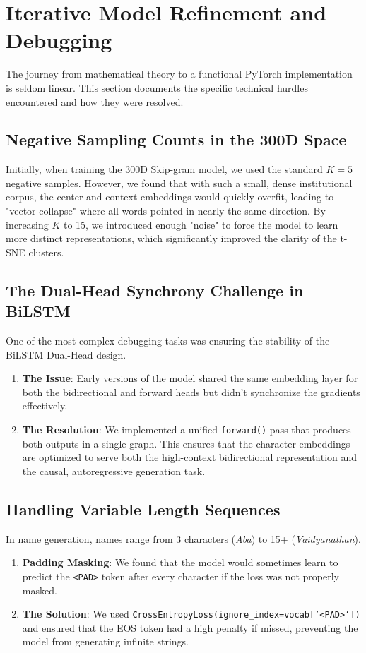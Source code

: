\documentclass[12pt,a4paper]{article}
\begin{document}
\section{Iterative Model Refinement and Debugging}
The journey from mathematical theory to a functional PyTorch implementation is seldom linear. This section documents the specific technical hurdles encountered and how they were resolved.

\subsection{Negative Sampling Counts in the 300D Space}
Initially, when training the 300D Skip-gram model, we used the standard $K=5$ negative samples. However, we found that with such a small, dense institutional corpus, the center and context embeddings would quickly overfit, leading to "vector collapse" where all words pointed in nearly the same direction.
By increasing $K$ to 15, we introduced enough "noise" to force the model to learn more distinct representations, which significantly improved the clarity of the t-SNE clusters.

\subsection{The Dual-Head Synchrony Challenge in BiLSTM}
One of the most complex debugging tasks was ensuring the stability of the BiLSTM Dual-Head design.
\begin{enumerate}
    \item \textbf{The Issue}: Early versions of the model shared the same embedding layer for both the bidirectional and forward heads but didn't synchronize the gradients effectively.
    \item \textbf{The Resolution}: We implemented a unified \texttt{forward()} pass that produces both outputs in a single graph. This ensures that the character embeddings are optimized to serve both the high-context bidirectional representation and the causal, autoregressive generation task.
\end{enumerate}

\subsection{Handling Variable Length Sequences}
In name generation, names range from 3 characters (\textit{Aba}) to 15+ (\textit{Vaidyanathan}).
\begin{enumerate}
    \item \textbf{Padding Masking}: We found that the model would sometimes learn to predict the \texttt{<PAD>} token after every character if the loss was not properly masked.
    \item \textbf{The Solution}: We used \texttt{CrossEntropyLoss(ignore\_index=vocab['<PAD>'])} and ensured that the EOS token had a high penalty if missed, preventing the model from generating infinite strings.
\end{enumerate}
\end{document}
